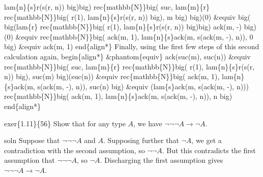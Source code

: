       lam\{n\}\{s\}r(s(r, n))
    big)big)
  rec\{mathbb\{N\}\}big(
    suc,
    lam\{m\}\{r\}
      rec\{mathbb\{N\}\}big(
        r(1),
        lam\{n\}\{s\}r(s(r, n))
      big),
    m
  big)
  big)(0)
  \&equiv
  big(
  big(lam\{r\}
    rec\{mathbb\{N\}\}big(
      r(1),
      lam\{n\}\{s\}r(s(r, n))
    big)big)
    ack(m, -)
  big)(0)
  \&equiv
  rec\{mathbb\{N\}\}big(
  ack(m, 1),
  lam\{n\}\{s\}ack(m, s(ack(m, -), n)),
  0
  big)
  \&equiv
  ack(m, 1)
end\{align*\}
Finally, using the first few steps of this second calculation again,
begin\{align*\}
  \&phantom\{equiv\} ack(suc(m), suc(n))
  \&equiv
  rec\{mathbb\{N\}\}big(
    suc,
    lam\{m\}\{r\}
      rec\{mathbb\{N\}\}big(
        r(1),
        lam\{n\}\{s\}r(s(r, n))
      big),
    suc(m)
  big)(suc(n))
  \&equiv
  rec\{mathbb\{N\}\}big(
  ack(m, 1),
  lam\{n\}\{s\}ack(m, s(ack(m, -), n)),
  suc(n)
  big)
  \&equiv
  (lam\{s\}ack(m, s(ack(m, -), n)))
  rec\{mathbb\{N\}\}big(
  ack(m, 1),
  lam\{n\}\{s\}ack(m, s(ack(m, -), n)),
  n
  big)
end\{align*\}


exer\{1.11\}\{56\}  Show that for any type $A$, we have $\lnot\lnot\lnot A \to
\lnot A$.


soln Suppose that $\lnot\lnot\lnot A$ and $A$.  Supposing further that $\lnot
A$, we get a contradiction with the second assumption, so $\lnot \lnot A$.  But
this contradicts the first assumption that $\lnot\lnot\lnot A$, so $\lnot A$.
Discharging the first assumption gives $\lnot\lnot\lnot A \to \lnot A$.


